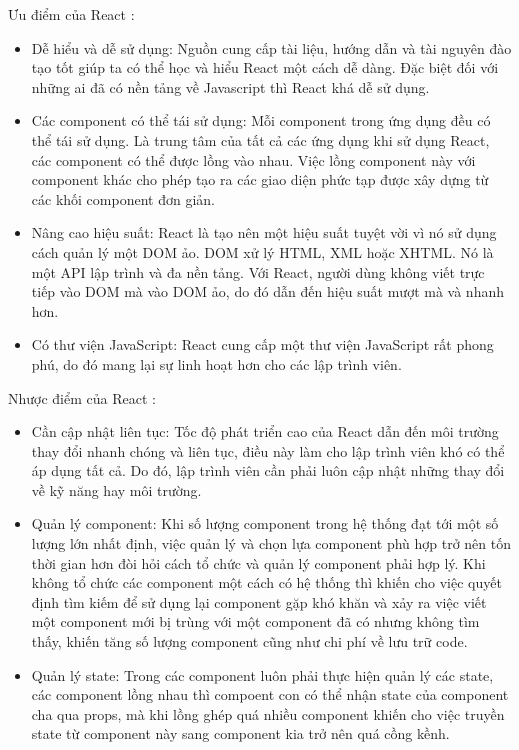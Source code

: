             Ưu điểm của React \cite{technologyReactAdvance}:
            \begin{itemize}
                \item Dễ hiểu và dễ sử dụng: Nguồn cung cấp tài liệu, hướng dẫn và tài nguyên đào tạo tốt giúp ta có thể học và hiểu React một cách dễ dàng. Đặc biệt đối với những ai đã có nền tảng về Javascript thì React khá dễ sử dụng.
                \item Các component có thể tái sử dụng: Mỗi component trong ứng dụng đều có thể tái sử dụng. Là trung tâm của tất cả các ứng dụng khi sử dụng React, các component có thể được lồng vào nhau. Việc lồng component này với component khác cho phép tạo ra các giao diện phức tạp được xây dựng từ các khối component đơn giản.
                \item Nâng cao hiệu suất: React là tạo nên một hiệu suất tuyệt vời vì nó sử dụng cách quản lý một DOM ảo. DOM xử lý HTML, XML hoặc XHTML. Nó là một API lập trình và đa nền tảng. Với React, người dùng không viết trực tiếp vào DOM mà vào DOM ảo, do đó dẫn đến hiệu suất mượt mà và nhanh hơn.
                \item Có thư viện JavaScript: React cung cấp một thư viện JavaScript rất phong phú, do đó mang lại sự linh hoạt hơn cho các lập trình viên.
            \end{itemize}

            Nhược điểm của React \cite{technologyReactAdvance}:
            \begin{itemize}
                \item Cần cập nhật liên tục: Tốc độ phát triển cao của React dẫn đến môi trường thay đổi nhanh chóng và liên tục, điều này làm cho lập trình viên khó có thể áp dụng tất cả. Do đó, lập trình viên cần phải luôn cập nhật những thay đổi về kỹ năng hay môi trường.
                \item Quản lý component: Khi số lượng component trong hệ thống đạt tới một số lượng lớn nhất định, việc quản lý và chọn lựa component phù hợp trở nên tốn thời gian hơn đòi hỏi cách tổ chức và quản lý component phải hợp lý. Khi không tổ chức các component một cách có hệ thống thì khiến cho việc quyết định tìm kiếm để sử dụng lại component gặp khó khăn và xảy ra việc viết một component mới bị trùng với một component đã có nhưng không tìm thấy, khiến tăng số lượng component cũng như chi phí về lưu trữ code.
                \item Quản lý state: Trong các component luôn phải thực hiện quản lý các state, các component lồng nhau thì compoent con có thể nhận state của component cha qua props, mà khi lồng ghép quá nhiều component khiến cho việc truyền state từ component này sang component kia trở nên quá cồng kềnh.
            \end{itemize}
